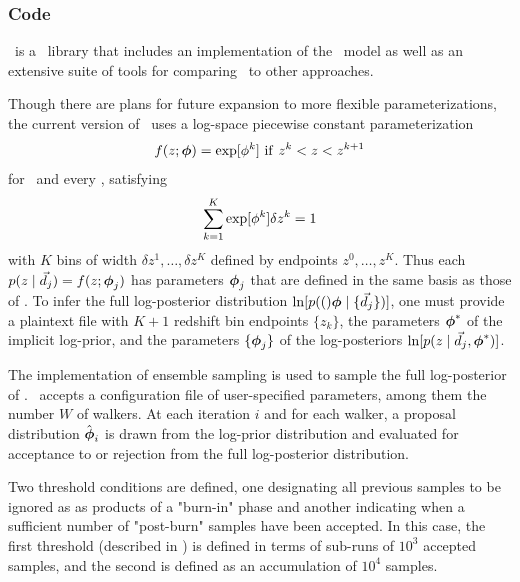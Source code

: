 \subsubsection{Code}

\chippr\ is a \python\ library that includes an implementation of the \Chippr\ model as well as an extensive suite of tools for comparing \Chippr\ to other approaches.

Though there are plans for future expansion to more flexible parameterizations, the current version of \chippr\ uses a log-space piecewise constant parameterization
\begin{equation}
\eqlabel{eqn:logstepfunc}
f(z; \ndphi) = \exp[\phi^{k}]\ \mathrm{if}\ z^{k} < z < z^{k+1}
\end{equation}
for \nz\ and every \pzpdf, satisfying
\begin{equation}
\eqlabel{eqn:logstepfuncnorm}
\sum_{k=1}^{K} \exp[\phi^{k}] \delta z^{k} = 1
\end{equation}
with $K$ bins of width $\delta z^{1}, \dots, \delta z^{K}$ defined by endpoints $z^{0}, \dots, z^{K}$.
Thus each $p(z \mid \vec{d}_{j}) = f(z; {\boldsymbol{\phi}}_{j})$ has parameters ${\boldsymbol{\phi}}_{j}$ that are defined in the same basis as those of \nz.
To infer the full log-posterior distribution $\ln[p((){\boldsymbol{\phi}} \mid \{\vec{d}_{j}\})]$, one must provide a plaintext file with $K+1$ redshift bin endpoints $\{z_{k}\}$, the parameters ${\boldsymbol{\phi}}^{*}$ of the implicit log-prior, and the parameters $\{{\boldsymbol{\phi}}_{j}\}$ of the log-posteriors $\ln[p(z \mid \vec{d}_{j}, {\boldsymbol{\phi}}^{*})]$.

The \emcee \citep{Foreman-Mackey2013} implementation of ensemble sampling is used to sample the full log-posterior of . 
\chippr\ accepts a configuration file of user-specified parameters, among them the number $W$ of walkers.
At each iteration $i$ and for each walker, a proposal distribution $\hat{{\boldsymbol{\phi}}}_{i}$ is drawn from the log-prior distribution and evaluated for acceptance to or rejection from the full log-posterior distribution.

Two threshold conditions are defined, one designating all previous samples to be ignored as as products of a "burn-in" phase and another indicating when a sufficient number of "post-burn" samples have been accepted.  
In this case, the first threshold (described in ) is defined in terms of sub-runs of $10^{3}$ accepted samples, and the second is defined as an accumulation of $10^{4}$ samples.

